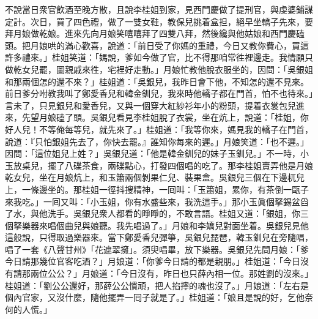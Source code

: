 不說當日衆官飲酒至晚方散，且說李桂姐到家，見西門慶做了提刑官，與虔婆鋪謀定計。次日，買了四色禮，做了一雙女鞋，教保兒挑着盒担，絕早坐轎子先來，要拜月娘做乾娘。進來先向月娘笑嘻嘻拜了四雙八拜，然後纔與他姑娘和西門慶磕頭。{}把月娘哄的滿心歡喜，說道：「前日受了你媽的重禮，今日又教你費心，買這許多禮來。」桂姐笑道：「媽說，爹如今做了官，比不得那咱常徃裡邊走。我情願只做乾女兒罷，圖親戚來徃，宅裡好走動。」月娘忙教他脫衣服坐的，因問：「吳銀姐和那兩個怎的還不來？」桂姐道：「吳銀兒，我昨日會下他，不知怎的還不見來。前日爹分咐教我叫了鄭愛香兒和韓金釧兒，我來時他轎子都在門首，怕不也待來。」言未了，只見銀兒和愛香兒，又與一個穿大紅紗衫年小的粉頭，提着衣裳包兒進來，先望月娘磕了頭。吳銀兒看見李桂姐脫了衣裳，坐在炕上，說道：「桂姐，你好人兒！不等俺每等兒，就先來了。」桂姐道：「我等你來，媽見我的轎子在門首，說道：『只怕銀姐先去了，你快去罷。』誰知你每來的遲。」月娘笑道：「也不遲。」因問：「這位姐兒上姓？」吳銀兒道：「他是韓金釧兒的妹子玉釧兒。」不一時，小玉放桌兒，擺了八碟茶食，兩碟點心，打發四個唱的吃了。那李桂姐賣弄他是月娘乾女兒，坐在月娘炕上，和玉簫兩個剝果仁兒、裝果盒。吳銀兒三個在下邊杌兒上，一條邊坐的。那桂姐一徑抖搜精神，一囘叫：「玉簫姐，累你，有茶倒一甌子來我吃。」一囘又叫：「小玉姐，你有水盛些來，我洗這手。」那小玉眞個拏錫盆舀了水，與他洗手。吳銀兒衆人都看的睜睜的，不敢言語。桂姐又道：「銀姐，你三個拏樂器來唱個曲兒與娘聽。我先唱過了。」{}月娘和李嬌兒對面坐着。吳銀兒見他這般說，只得取過樂器來。當下鄭愛香兒彈箏，吳銀兒琵琶，韓玉釧兒在旁隨唱，唱了一套《八聲甘州》「花遮翠擁」。須臾唱畢，放下樂器。吳銀兒先問月娘：「爹今日請那幾位官客吃酒？」月娘道：「你爹今日請的都是親朋。」桂姐道：「今日沒有請那兩位公公？」月娘道：「今日沒有，昨日也只薛內相一位。那姓劉的沒來。」桂姐道：「劉公公還好，那薛公公慣頑，把人掐擰的魂也沒了。」月娘道：「左右是個內官家，又沒什麼，{}隨他擺弄一囘子就是了。」桂姐道：「娘且是說的好，乞他奈何的人慌。」

